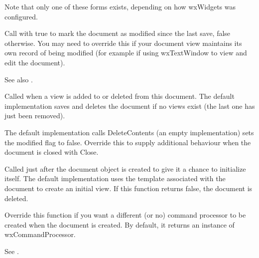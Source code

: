 Note that only one of these forms exists, depending on how wxWidgets
was configured.

\label{wxdocumentmodify}


Call with true to mark the document as modified since the last save, false otherwise.
You may need to override this if your document view maintains its own
record of being modified (for example if using wxTextWindow to view and edit the document).

See also .

\label{wxdocumentonchangedviewlist}


Called when a view is added to or deleted from this document. The default
implementation saves and deletes the document if no views exist (the last
one has just been removed).

\label{wxdocumentonclosedocument}


The default implementation calls DeleteContents (an empty implementation)
sets the modified flag to false. Override this to
supply additional behaviour when the document is closed with Close.

\label{wxdocumentoncreate}


Called just after the document object is created to give it a chance
to initialize itself. The default implementation uses the
template associated with the document to create an initial view.
If this function returns false, the document is deleted.

\label{wxdocumentoncreatecommandprocessor}


Override this function if you want a different (or no) command processor
to be created when the document is created. By default, it returns
an instance of wxCommandProcessor.

See .

